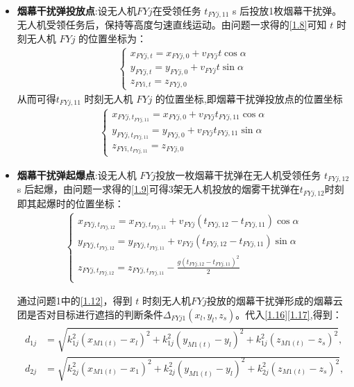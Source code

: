 \documentclass[../main.tex]{subfiles}
\begin{document}
\begin{itemize}
\item \textbf{烟幕干扰弹投放点}:设无人机$FYj$在受领任务 \( t_{FYj,11} \) s 后投放1枚烟幕干扰弹。无人机受领任务后，保持等高度匀速直线运动。由问题一求得的\eqref{1.8}可知 \( t \) 时刻无人机 \( FYj \) 的位置坐标为：
\begin{align}\label{19.3}
  \begin{cases}
x_{FYj,t} = x_{FYj,0} + v_{FYj} t \cos\alpha \\
y_{FYj,t} = y_{FYj,0} + v_{FYj} t \sin\alpha \\
z_{FYi,t} = z_{FYj,0}
\end{cases}
\end{align}
从而可得\( t_{FYj,11} \) 时刻无人机 \( FYj \) 的位置坐标,即烟幕干扰弹投放点的位置坐标
\begin{align}
  \begin{cases}
x_{FYj,t_{FYj,11}} = x_{FYj,0} + v_{FYj} t_{FYj,11} \cos\alpha \\
y_{FYj,t_{FYj,11}} = y_{FYj,0} + v_{FYj} t_{FYj,11} \sin\alpha \\
z_{FYi,t_{FYj,11}} = z_{FYj,0}
\end{cases}
\end{align}
\item \textbf{烟幕干扰弹起爆点}:设无人机 $FYj $投放一枚烟幕干扰弹在无人机受领任务 \( t_{FYj,12} \) s 后起爆，由问题一求得的\eqref{1.9}可得3架无人机投放的烟雾干扰弹在$t_{FYj,12}$时刻即其起爆时的位置坐标：
\begin{align}\label{19.4}
\left\{ \begin{array}{l}
	x_{FYj,t_{FYj,12}}=x_{FYj,t_{FYj,11}}+v_{FYj}\left( t_{FYj,12}-t_{FYj,11} \right) \cos \alpha\\
	y_{FYj,t_{FYj,12}}=y_{FYj,t_{FYj,11}}+v_{FYj}\left( t_{FYj,12}-t_{FYj,11} \right) \sin \alpha\\
	z_{FYj,t_{FYj,12}}=z_{FYj,t_{FYj,11}}-\frac{g\left( t_{FYj,12}-t_{FYj,11} \right) ^2}{2}\\
\end{array} \right. 
\end{align}
\par 通过问题1中的\eqref{1.12}，得到 $t$ 时刻无人机$FYj$投放的烟幕干扰弹形成的烟幕云团是否对目标进行遮挡的判断条件$\Delta _{FYj1}\left( x_l,y_l,z_s \right) $。代入\eqref{1.16}\eqref{1.17},得到：
\begin{align}\label{1.1713}
	\begin{aligned}
d_{1j} &= \sqrt{k_{1j}^2(x_{M1(t)} - x_l)^2 + k_{1j}^2(y_{M1(t)} - y_l)^2 + k_{1j}^2(z_{M1(t)} - z_s)^2}, \\
d_{2j} &= \sqrt{k_{2j}^2(x_{M1(t)} - x_1)^2 + k_{2j}^2(y_{M1(t)} - y_l)^2 + k_{2j}^2(z_{M1(t)} - z_s)^2},
\end{aligned}
\end{align}





\end{itemize}
\end{document}
